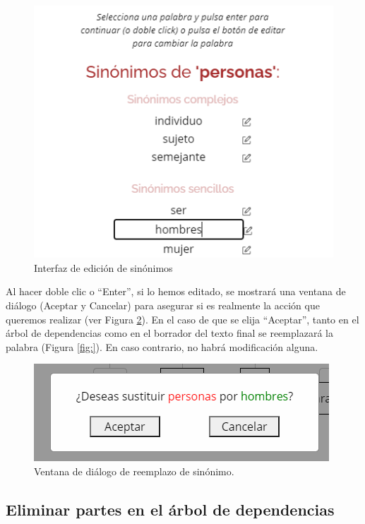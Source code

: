 \begin{figure}[h!]
\centering


\includegraphics[scale=1.0]{Imagenes/Figuras/EditarSinonimo}


\caption{Interfaz de edición de sinónimos}
\label{fig:edicionSinonimos}
\end{figure}
Al hacer doble clic o ``Enter'', si lo hemos editado, se mostrará una ventana de diálogo (Aceptar y Cancelar) para asegurar si es realmente la acción que queremos realizar (ver Figura \ref{fig:modalSinonimos}). En el caso de que se elija ``Aceptar'', tanto en el árbol de dependencias como en el borrador del texto final se reemplazará la palabra (Figura \ref{fig:}). En caso contrario, no habrá modificación alguna.

\begin{figure}[h!]
	\centering
	
	
	\includegraphics[scale=1.0]{Imagenes/Figuras/modalSinonimos}
	
	
	\caption{Ventana de diálogo de reemplazo de sinónimo.}
	\label{fig:modalSinonimos}
\end{figure}

\subsection{Eliminar partes en el árbol de dependencias}


